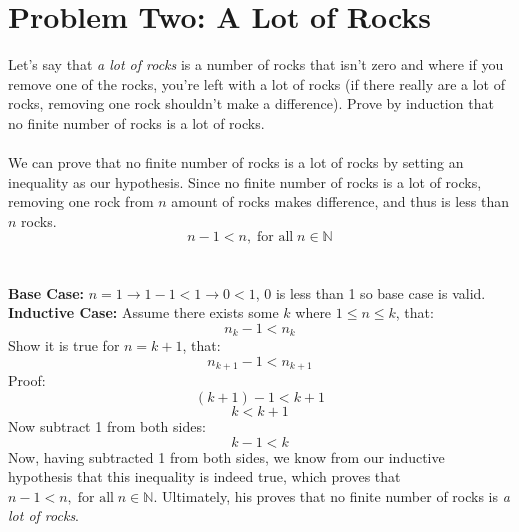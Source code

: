 \documentclass{article}
\begin{document}
\section*{Problem Two: A Lot of Rocks}
Let's say that \textit{a lot of rocks} is a number of rocks that isn't zero and where if you remove one of the rocks, you're left with a lot of rocks (if there really are a lot of rocks, removing one rock shouldn't make a difference). Prove by induction that no finite number of rocks is a lot of rocks.
\\
\\We can prove that no finite number of rocks is a lot of rocks by setting an inequality as our hypothesis. Since no finite number of rocks is a lot of rocks, removing one rock from $n$ amount of rocks makes difference, and thus is less than $n$ rocks.
$$n - 1 < n, \; \text{for all} \; n \in \mathbb{N}$$
\\
\\\textbf{Base Case:} $n = 1 \to 1 - 1 < 1 \to 0 < 1$, 0 is less than 1 so base case is valid.
\\\textbf{Inductive Case:} Assume there exists some $k$ where $1 \leqslant n \leqslant k$, that:
$$n_k - 1 < n_k$$
Show it is true for $n = k + 1$, that:
$$n_{k+1} - 1 < n_{k+1}$$
Proof:
$$(k + 1) - 1 < k + 1$$
$$k < k + 1$$
Now subtract 1 from both sides:
$$k - 1 < k$$
Now, having subtracted 1 from both sides, we know from our inductive hypothesis that this inequality is indeed true, which proves that $n - 1 < n, \; \text{for all} \; n \in \mathbb{N}$. Ultimately, his proves that no finite number of rocks is \textit{a lot of rocks}.
\end{document}
